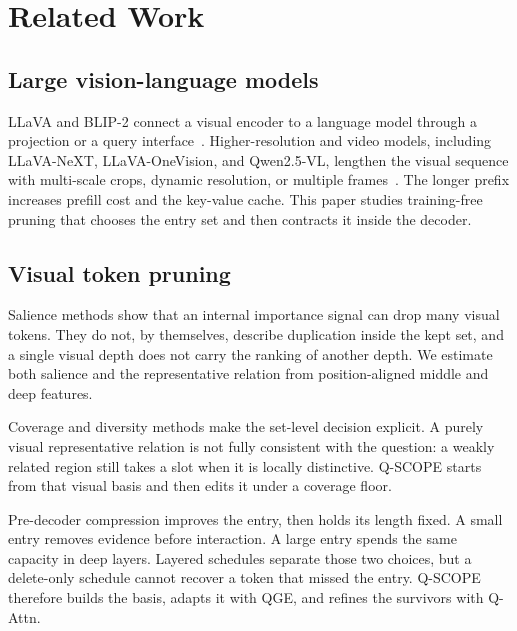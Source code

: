 \section{Related Work}
\label{sec:related}

\subsection{Large vision-language models}
LLaVA and BLIP-2 connect a visual encoder to a language model through a projection or a query interface~\cite{llava15,blip2}. Higher-resolution and video models, including LLaVA-NeXT, LLaVA-OneVision, and Qwen2.5-VL, lengthen the visual sequence with multi-scale crops, dynamic resolution, or multiple frames~\cite{llavanext,onevision,qwen25vl}. The longer prefix increases prefill cost and the key-value cache. This paper studies training-free pruning that chooses the entry set and then contracts it inside the decoder.

\subsection{Visual token pruning}
Salience methods show that an internal importance signal can drop many visual tokens. They do not, by themselves, describe duplication inside the kept set, and a single visual depth does not carry the ranking of another depth. We estimate both salience and the representative relation from position-aligned middle and deep features.

Coverage and diversity methods make the set-level decision explicit. A purely visual representative relation is not fully consistent with the question: a weakly related region still takes a slot when it is locally distinctive. Q-SCOPE starts from that visual basis and then edits it under a coverage floor.

Pre-decoder compression improves the entry, then holds its length fixed. A small entry removes evidence before interaction. A large entry spends the same capacity in deep layers. Layered schedules separate those two choices, but a delete-only schedule cannot recover a token that missed the entry. Q-SCOPE therefore builds the basis, adapts it with QGE, and refines the survivors with Q-Attn.
